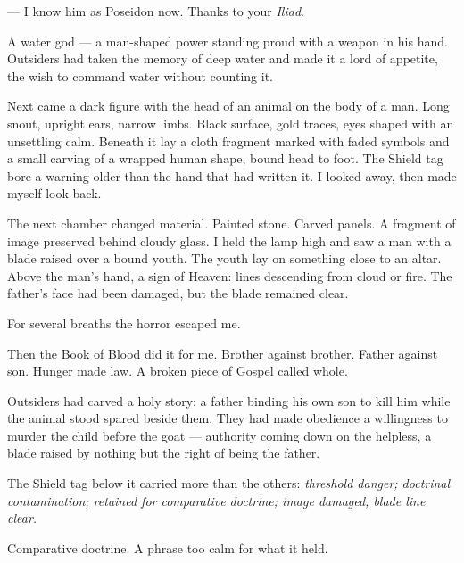 \begin{room}

--- I know him as Poseidon now. Thanks to your \textit{Iliad}.

\end{room}

A water god --- a man-shaped power standing proud with a weapon in his hand. Outsiders had taken the memory of deep water and made it a lord of appetite, the wish to command water without counting it.\par

Next came a dark figure with the head of an animal on the body of a man. Long snout, upright ears, narrow limbs. Black surface, gold traces, eyes shaped with an unsettling calm. Beneath it lay a cloth fragment marked with faded symbols and a small carving of a wrapped human shape, bound head to foot. The Shield tag bore a warning older than the hand that had written it. I looked away, then made myself look back.\par

The next chamber changed material. Painted stone. Carved panels. A fragment of image preserved behind cloudy glass. I held the lamp high and saw a man with a blade raised over a bound youth. The youth lay on something close to an altar. Above the man's hand, a sign of Heaven: lines descending from cloud or fire. The father's face had been damaged, but the blade remained clear.\par

For several breaths the horror escaped me.\par

Then the Book of Blood did it for me. Brother against brother. Father against son. Hunger made law. A broken piece of Gospel called whole.\par

Outsiders had carved a holy story: a father binding his own son to kill him while the animal stood spared beside them. They had made obedience a willingness to murder the child before the goat --- authority coming down on the helpless, a blade raised by nothing but the right of being the father.\par

The Shield tag below it carried more than the others: \textit{threshold danger; doctrinal contamination; retained for comparative doctrine; image damaged, blade line clear.}\par

Comparative doctrine. A phrase too calm for what it held.\par

